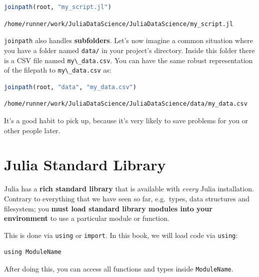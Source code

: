 \documentclass[
  notoc %
]{tufte-book}
\newcommand{\passthrough}[1]{#1}
\begin{document}
\begin{lstlisting}[language=Julia]
joinpath(root, "my_script.jl")
\end{lstlisting}

\begin{lstlisting}[language=Output]
/home/runner/work/JuliaDataScience/JuliaDataScience/my_script.jl
\end{lstlisting}

\passthrough{\lstinline!joinpath!} also handles \textbf{subfolders}.
Let's now imagine a common situation where you have a folder named
\passthrough{\lstinline!data/!} in your project's directory. Inside this
folder there is a CSV file named \passthrough{\lstinline!my\_data.csv!}.
You can have the same robust representation of the filepath to
\passthrough{\lstinline!my\_data.csv!} as:

\begin{lstlisting}[language=Julia]
joinpath(root, "data", "my_data.csv")
\end{lstlisting}

\begin{lstlisting}[language=Output]
/home/runner/work/JuliaDataScience/JuliaDataScience/data/my_data.csv
\end{lstlisting}

It's a good habit to pick up, because it's very likely to save problems
for you or other people later.

\hypertarget{sec:standardlibrary}{%
\section{Julia Standard Library}\label{sec:standardlibrary}}

Julia has a \textbf{rich standard library} that is available with
\emph{every} Julia installation. Contrary to everything that we have
seen so far, e.g.~types, data structures and filesystem; you
\textbf{must load standard library modules into your environment} to use
a particular module or function.

This is done via \passthrough{\lstinline!using!} or
\passthrough{\lstinline!import!}. In this book, we will load code via
\passthrough{\lstinline!using!}:

\begin{lstlisting}
using ModuleName
\end{lstlisting}

After doing this, you can access all functions and types inside
\passthrough{\lstinline!ModuleName!}.
\end{document}
